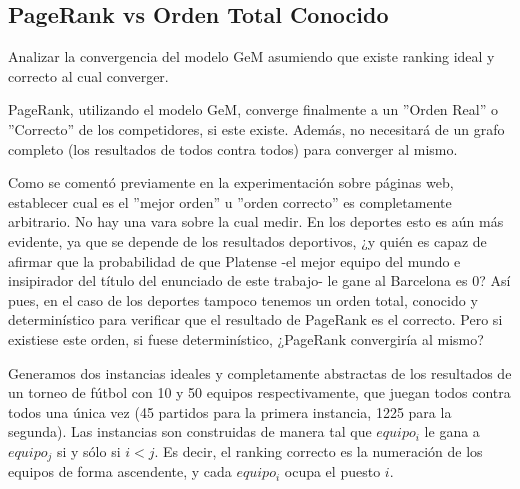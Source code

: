 \subsection{PageRank vs Orden Total Conocido}
\label{subsec:exp5}
\begin{LaTeXdescription}
    \item[Objetivo] Analizar la convergencia del modelo GeM asumiendo que
        existe ranking ideal y correcto al cual converger.\\

    \item[Hip\'otesis] PageRank, utilizando el modelo GeM, converge finalmente a
        un ''Orden Real'' o ''Correcto'' de los competidores, si este existe.
        Adem\'as, no necesitar\'a de un grafo completo (los resultados de todos
        contra todos) para converger al mismo.\\

    \item[Proposici\'on] Como se coment\'o previamente en la experimentaci\'on
        sobre p\'aginas web, establecer cual es el ''mejor orden'' u ''orden
        correcto'' es completamente arbitrario. No hay una vara sobre la cual
        medir. En los deportes esto es a\'un más evidente, ya que se depende de
        los resultados deportivos, ¿y qui\'en es capaz de afirmar que la
        probabilidad de que Platense -el mejor equipo del mundo e insipirador
        del t\'itulo del enunciado de este trabajo- le gane al Barcelona es $0$?
        As\'i pues, en el caso de los deportes tampoco tenemos un orden total,
        conocido y determin\'istico para verificar que el resultado de PageRank
        es el correcto. Pero si existiese este orden, si fuese determin\'istico,
        ¿PageRank convergir\'ia al mismo?\\

    \item[M\'etodo de Experimentaci\'on] Generamos dos instancias ideales y
        completamente abstractas de los resultados de un torneo de f\'utbol con
        10 y 50 equipos respectivamente, que juegan todos contra todos una
        \'unica vez (45 partidos para la primera instancia, 1225 para la
        segunda). Las instancias son construidas de manera tal que $equipo_i$ le
        gana a $equipo_j$ si y s\'olo si $i<j$. Es decir, el ranking correcto es
        la numeraci\'on de los equipos de forma ascendente, y cada $equipo_i$
        ocupa el puesto $i$.


\end{LaTeXdescription}
